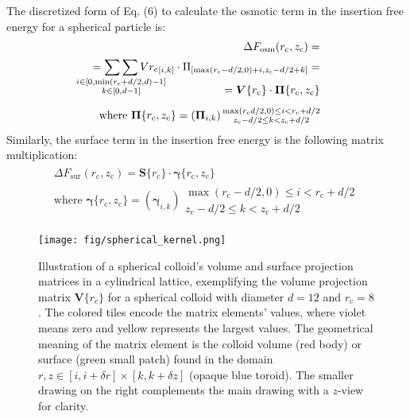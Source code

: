 \documentclass[10pt, a4paper]{article}
\begin{document}
\begin{multicols}{2}
The discretized form of Eq. (6) to calculate the osmotic term in the insertion free energy for a spherical particle is:
\begin{eqnarray}
    \begin{split}
        \Delta F_{\text{osm}}(r_{\text{c}}, z_{\text{c}}) =\\
        = \mathop{\sum\sum}_{\mathclap{\substack{i \in [0, \min(r_{\text{c}}+d/2,d)-1] \\ k \in [0, d-1]}}} V{r_{\text{c}}}_{[i, k]} \cdot \Pi_{[\max(r_{\text{c}}-d/2,0)+i, z_{\text{c}}-d/2+k]} =\\[-15pt]
        = \bm{V}\{r_{\text{c}}\} \cdot \bm{\Pi}\{r_{\text{c}}, z_{\text{c}}\} \\[5pt]
        \text{where } \bm{\Pi}\{r_{\text{c}},z_{\text{c}}\} =\left(\bm{\Pi}_{i,k}\right) {\substack{\max(r_{\text{c}}d/2,0) \le i < r_{\text{c}}+d/2 \\ z_{\text{c}}-d/2 \le k < z_{\text{c}}+d/2}}
    \end{split}
\end{eqnarray}
Similarly, the surface term in the insertion free energy is the following matrix multiplication:
\begin{eqnarray}
    \begin{split}
        \Delta F_{\text{sur}}(r_{\text{c}}, z_{\text{c}}) = \bm{S}\{r_{\text{c}}\} \cdot \bm{\gamma}\{r_{\text{c}}, z_{\text{c}}\} \\[5pt]
        \text{where } \bm{\gamma}\{r_{\text{c}},z_{\text{c}}\} =\left(\bm{\gamma}_{i,k}\right) {\substack{\max(r_{\text{c}}-d/2,0) \le i < r_{\text{c}}+d/2 \\ z_{\text{c}}-d/2 \le k < z_{\text{c}}+d/2}}
    \end{split}
\end{eqnarray}

\begin{figure}[H]
    \centering
    \texttt{[image: fig/spherical\_kernel.png]}
    \caption{
        Illustration of a spherical colloid's volume and surface projection matrices in a cylindrical lattice, exemplifying the volume projection matrix $\bm{V}\{r_c\}$ for a spherical colloid with diameter $d = 12$ and $r_{\text{c}}= 8$.
        The colored tiles encode the matrix elements' values, where violet means zero and yellow represents the largest values.
        The geometrical meaning of the matrix element is the colloid volume (red body) or surface (green small patch) found in the domain $r,z \in [i, i + \delta r] \times [k, k + \delta z]$ (opaque blue toroid).
        The smaller drawing on the right complements the main drawing with a $z$-view for clarity.
    }
    \label{fig:spherical_kernel}
\end{figure}


\end{multicols}
\end{document}
